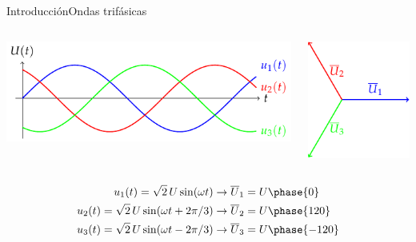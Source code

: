 \documentclass[aspectratio=169, xcolor={usenames,svgnames,dvipsnames}]{beamer}
\begin{document}
\begin{frame}{Introducción}{Ondas trifásicas}
  
    \begin{columns}
      \begin{column}{0.5\linewidth}
        \begin{center}
          \includegraphics{../figs/TensionesTrifasica.pdf}
        \end{center}
      \end{column}
      \begin{column}{0.5\linewidth}
        \begin{center}
          \includegraphics{../figs/FasoresTrifasica.pdf}
        \end{center}
      \end{column}
    \end{columns}
    

\begin{align*}
  u_1(t) = \sqrt{2}\, U \sin(\omega t) & \rightarrow \overline{U}_1 = U\phase{0}\\
  u_2(t) = \sqrt{2}\, U \sin(\omega t + 2\pi/3)& \rightarrow \overline{U}_2 = U\phase{120}\\
  u_3(t) = \sqrt{2}\, U \sin(\omega t - 2\pi/3) & \rightarrow \overline{U}_3 = U\phase{-120}
\end{align*}
\end{frame}
\end{document}
